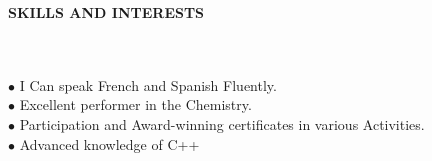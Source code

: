 \documentclass[10pt]{article}
\begin{document}
    \begin{large}  
    \textbf{SKILLS AND INTERESTS}  
    \end{large}\\ \\  
    $\bullet$ I Can speak French and Spanish Fluently.\\  
    $\bullet$ Excellent performer in the Chemistry.\\  
    $\bullet$ Participation and Award-winning certificates in various Activities.\\  
    $\bullet$ Advanced knowledge of C++  
      
    
\end{document}
